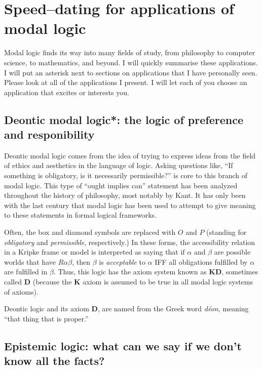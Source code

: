 \chapter[A taste of some applications of modal logic]{Speed--dating for applications of modal logic}

Modal logic finds its way into many fields of study, from philosophy to computer science, to mathematics,
and beyond. I will quickly summarise these applications. I will put an asterisk next
to sections on applications that I have personally seen. Please look at all of the
applications I present. I will let each of you choose an application that excites or
interests you.

\setcounter{section}{-1}

\section{Deontic modal logic*: the logic of preference and responibility}
Deontic modal logic comes from the idea of trying to express ideas from the field of ethics and aesthetics
in the language of logic. Asking questions like, ``If something is obligatory, is it necessarily permissible?''
is core to this branch of modal logic. This type of ``ought implies can'' statement has been analyzed
throughout the history of philosophy, most notably by Kant. It has only been with the last century that modal 
logic has been used to attempt to give meaning to these statements in formal logical frameworks.

Often, the box and diamond symbols are replaced with $O$ and $P$ (standing for \emph{obligatory} and
\emph{permissible}, respectively.) In these forms, the accessibility relation in a Kripke frame 
or model is interpreted as saying that if $\alpha$ and $\beta$ are possible worlds that have $R \alpha \beta$,
then $\beta$ is \emph{acceptable} to $\alpha$ IFF all obligations fulfilled by $\alpha$ are fulfilled
in $\beta$. Thus, this logic has the axiom system known as \textbf{KD}, sometimes called \textbf{D} 
(because the \textbf{K} axiom is assumed to be true in all modal logic systems of axioms).

Deontic logic and its axiom \textbf{D}, are named from the Greek word \emph{d\'eon}, meaning ``that thing
that is proper.''

\section{Epistemic logic: what can we say if we don't know all the facts?}


